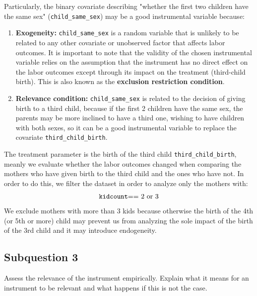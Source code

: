 \documentclass{article}
\begin{document}
	Particularly, the binary covariate describing "whether the first two children have the same sex" (\verb|child_same_sex|) may be a good instrumental variable because:
	\begin{enumerate}
		\item \textbf{Exogeneity:} \verb|child_same_sex| is a random variable that is unlikely to be related to any other covariate or unobserved factor that affects labor outcomes. It is important to note that the validity of the chosen instrumental variable relies on the assumption that the instrument has no direct effect on the labor outcomes except through its impact on the treatment (third-child birth). This is also known as the \textbf{exclusion restriction condition}.
		\item \textbf{Relevance condition:} \verb|child_same_sex| is related to the decision of giving birth to a third child, because if the first 2 children have the same sex, the parents may be more inclined to have a third one, wishing to have children with both sexes, so it can be a good instrumental variable to replace the covariate \verb|third_child_birth|.
	\end{enumerate}
	
	The treatment parameter is the birth of the third child \verb|third_child_birth|, meanly we evaluate whether the labor outcomes changed when comparing the mothers who have given birth to the third child and the ones who have not.
	In order to do this, we filter the dataset in order to analyze only the mothers with: 
	$$\verb|kidcount| \text{== 2 or 3}$$
	We exclude mothers with more than 3 kids because otherwise the birth of the 4th (or 5th or more) child may prevent us from analyzing the sole impact of the birth of the 3rd child and it may introduce endogeneity.
	
	
	\subsection{Subquestion 3}
	
	Assess the relevance of the instrument empirically. Explain what it means for an instrument to be relevant and what happens if this is not the case.
\end{document}
